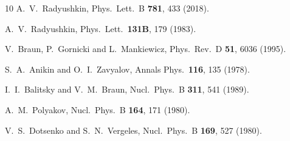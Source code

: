 \begin{thebibliography}{10}
  A.~V.~Radyushkin,
  Phys.\ Lett.\ B {\bf 781}, 433 (2018).


  A.~V.~Radyushkin,
  Phys.\ Lett.\  {\bf 131B}, 179 (1983).


  V.~Braun, P.~Gornicki and L.~Mankiewicz,
  Phys.\ Rev.\ D {\bf 51}, 6036 (1995).


  S.~A.~Anikin and O.~I.~Zavyalov,
  Annals Phys.\  {\bf 116}, 135 (1978).


  I.~I.~Balitsky and V.~M.~Braun,
  Nucl.\ Phys.\ B {\bf 311}, 541 (1989).


  A.~M.~Polyakov,
  Nucl.\ Phys.\ B {\bf 164}, 171 (1980).


  V.~S.~Dotsenko and S.~N.~Vergeles,
  Nucl.\ Phys.\ B {\bf 169}, 527 (1980).



\end{thebibliography}
